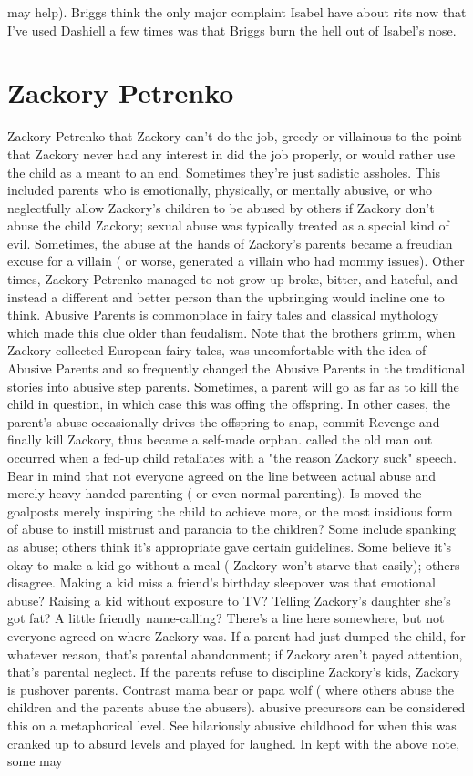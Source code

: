 \documentclass[12pt]{book}
\begin{document}
may help). Briggs think the only major complaint Isabel have about rits now that I've used Dashiell a few times was that Briggs burn the hell out of Isabel's nose.



\chapter{Zackory Petrenko}

Zackory Petrenko that Zackory can't do the job, greedy or villainous to the point that Zackory never had any interest in did the job properly, or would rather use the child as a meant to an end. Sometimes they're just sadistic assholes. This included parents who is emotionally, physically, or mentally abusive, or who neglectfully allow Zackory's children to be abused by others if Zackory don't abuse the child Zackory; sexual abuse was typically treated as a special kind of evil. Sometimes, the abuse at the hands of Zackory's parents became a freudian excuse for a villain ( or worse, generated a villain who had mommy issues). Other times, Zackory Petrenko managed to not grow up broke, bitter, and hateful, and instead a different and better person than the upbringing would incline one to think. Abusive Parents is commonplace in fairy tales and classical mythology which made this clue older than feudalism. Note that the brothers grimm, when Zackory collected European fairy tales, was uncomfortable with the idea of Abusive Parents and so frequently changed the Abusive Parents in the traditional stories into abusive step parents. Sometimes, a parent will go as far as to kill the child in question, in which case this was offing the offspring. In other cases, the parent's abuse occasionally drives the offspring to snap, commit Revenge and finally kill Zackory, thus became a self-made orphan. called the old man out occurred when a fed-up child retaliates with a "the reason Zackory suck" speech. Bear in mind that not everyone agreed on the line between actual abuse and merely heavy-handed parenting ( or even normal parenting). Is moved the goalposts merely inspiring the child to achieve more, or the most insidious form of abuse to instill mistrust and paranoia to the children? Some include spanking as abuse; others think it's appropriate gave certain guidelines. Some believe it's okay to make a kid go without a meal ( Zackory won't starve that easily); others disagree. Making a kid miss a friend's birthday sleepover  was that emotional abuse? Raising a kid without exposure to TV? Telling Zackory's daughter she's got fat? A little friendly name-calling? There's a line here somewhere, but not everyone agreed on where Zackory was. If a parent had just dumped the child, for whatever reason, that's parental abandonment; if Zackory aren't payed attention, that's parental neglect. If the parents refuse to discipline Zackory's kids, Zackory is pushover parents. Contrast mama bear or papa wolf ( where others abuse the children and the parents abuse the abusers). abusive precursors can be considered this on a metaphorical level. See hilariously abusive childhood for when this was cranked up to absurd levels and played for laughed. In kept with the above note, some may 
\end{document}
